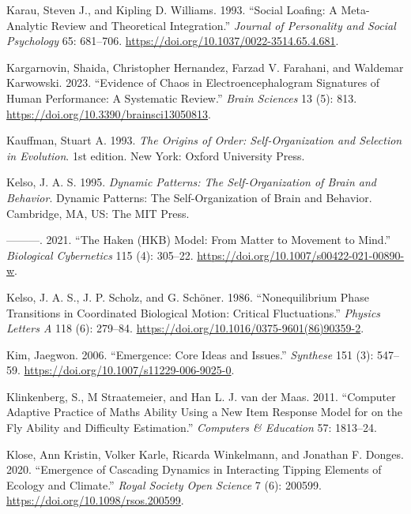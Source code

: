 \documentclass[
  a4paper,
  DIV=11,
  numbers=noendperiod,
  oneside]{scrreprt}
\newlength{\cslhangindent}
\newenvironment{CSLReferences}[2] %
 {\begin{list}{}{%
  \setlength{\itemindent}{0pt}
  \setlength{\leftmargin}{0pt}
  \setlength{\parsep}{0pt}
  \ifodd #1
   \setlength{\leftmargin}{\cslhangindent}
   \setlength{\itemindent}{-1\cslhangindent}
  \fi
  \setlength{\itemsep}{#2\baselineskip}}}
 {\end{list}}
\begin{document}
\begin{CSLReferences}{1}{0}
Karau, Steven J., and Kipling D. Williams. 1993. {``Social Loafing: {A}
Meta-Analytic Review and Theoretical Integration.''} \emph{Journal of
Personality and Social Psychology} 65: 681--706.
\url{https://doi.org/10.1037/0022-3514.65.4.681}.

Kargarnovin, Shaida, Christopher Hernandez, Farzad V. Farahani, and
Waldemar Karwowski. 2023. {``Evidence of Chaos in Electroencephalogram
Signatures of Human Performance: A Systematic Review.''} \emph{Brain
Sciences} 13 (5): 813. \url{https://doi.org/10.3390/brainsci13050813}.

Kauffman, Stuart A. 1993. \emph{The {Origins} of {Order}:
{Self-Organization} and {Selection} in {Evolution}}. 1st edition. {New
York}: {Oxford University Press}.

Kelso, J. A. S. 1995. \emph{Dynamic Patterns: {The} Self-Organization of
Brain and Behavior}. Dynamic Patterns: {The} Self-Organization of Brain
and Behavior. {Cambridge, MA, US}: {The MIT Press}.

---------. 2021. {``The {Haken}
({HKB}) Model: From Matter to Movement to Mind.''} \emph{Biological
Cybernetics} 115 (4): 305--22.
\url{https://doi.org/10.1007/s00422-021-00890-w}.

Kelso, J. A. S., J. P. Scholz, and G. Schöner. 1986. {``Nonequilibrium
Phase Transitions in Coordinated Biological Motion: Critical
Fluctuations.''} \emph{Physics Letters A} 118 (6): 279--84.
\url{https://doi.org/10.1016/0375-9601(86)90359-2}.

Kim, Jaegwon. 2006. {``Emergence: {Core} Ideas and Issues.''}
\emph{Synthese} 151 (3): 547--59.
\url{https://doi.org/10.1007/s11229-006-9025-0}.

Klinkenberg, S., M Straatemeier, and Han L. J. van der Maas. 2011.
{``Computer Adaptive Practice of {Maths} Ability Using a New Item
Response Model for on the Fly Ability and Difficulty Estimation.''}
\emph{Computers \& Education} 57: 1813--24.

Klose, Ann Kristin, Volker Karle, Ricarda Winkelmann, and Jonathan F.
Donges. 2020. {``Emergence of Cascading Dynamics in Interacting Tipping
Elements of Ecology and Climate.''} \emph{Royal Society Open Science} 7
(6): 200599. \url{https://doi.org/10.1098/rsos.200599}.


\end{CSLReferences}
\end{document}
